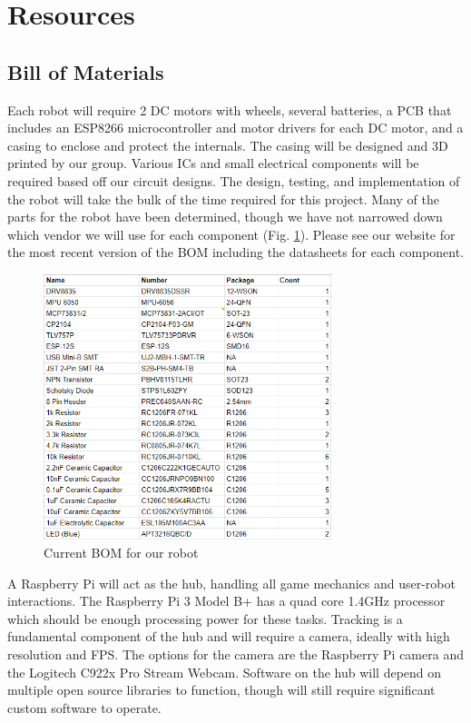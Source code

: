 \documentclass[11pt]{ieeeconf}
\begin{document}
\section{Resources}
\subsection{Bill of Materials}

Each robot will require 2 DC motors with wheels, several batteries, a PCB that includes an ESP8266 microcontroller and motor drivers for each DC motor, and a casing to enclose and protect the internals. The casing will be designed and 3D printed by our group. Various ICs and small electrical components will be required based off our circuit designs. The design, testing, and implementation of the robot will take the bulk of the time required for this project. Many of the parts for the robot have been determined, though we have not narrowed down which vendor we will use for each component (Fig. \ref{robobom}). Please see our website for the most recent version of the BOM including the datasheets for each component.

 \begin{figure}[h]
  \centering
  \captionsetup{justification=centering}
      \includegraphics[width=0.75\textwidth]{images/bom.png}
        \caption{Current BOM for our robot}
        \label{robobom}
\end{figure}

A Raspberry Pi will act as the hub, handling all game mechanics and user-robot interactions. The Raspberry Pi 3 Model B+ has a quad core 1.4GHz processor which should be enough processing power for these tasks. Tracking is a fundamental component of the hub and will require a camera, ideally with high resolution and FPS. The options for the camera are the Raspberry Pi camera and the Logitech C922x Pro Stream Webcam. Software on the hub will depend on multiple open source libraries to function, though will still require significant custom software to operate.
\end{document}
